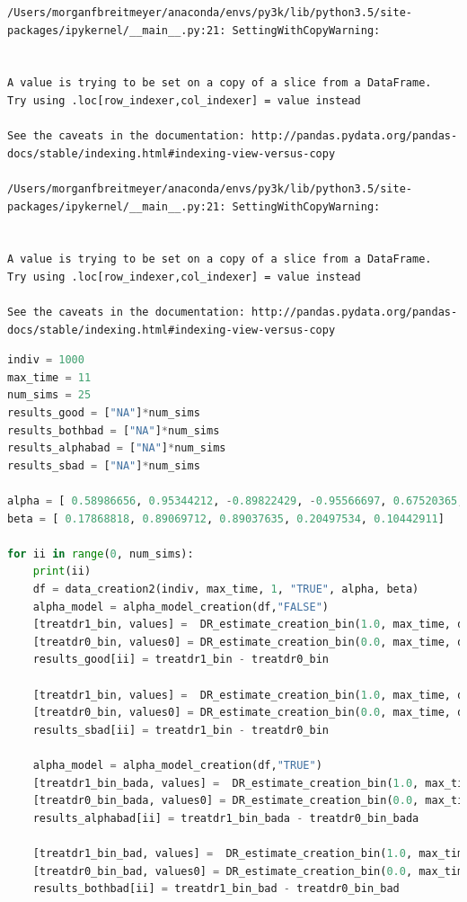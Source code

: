 \begin{lstlisting}
/Users/morganfbreitmeyer/anaconda/envs/py3k/lib/python3.5/site-packages/ipykernel/__main__.py:21: SettingWithCopyWarning:


A value is trying to be set on a copy of a slice from a DataFrame.
Try using .loc[row_indexer,col_indexer] = value instead

See the caveats in the documentation: http://pandas.pydata.org/pandas-docs/stable/indexing.html#indexing-view-versus-copy

/Users/morganfbreitmeyer/anaconda/envs/py3k/lib/python3.5/site-packages/ipykernel/__main__.py:21: SettingWithCopyWarning:


A value is trying to be set on a copy of a slice from a DataFrame.
Try using .loc[row_indexer,col_indexer] = value instead

See the caveats in the documentation: http://pandas.pydata.org/pandas-docs/stable/indexing.html#indexing-view-versus-copy
\end{lstlisting}

\begin{lstlisting}[language=Python]
indiv = 1000 
max_time = 11
num_sims = 25
results_good = ["NA"]*num_sims
results_bothbad = ["NA"]*num_sims
results_alphabad = ["NA"]*num_sims
results_sbad = ["NA"]*num_sims

alpha = [ 0.58986656, 0.95344212, -0.89822429, -0.95566697, 0.67520365, 2.46365403]
beta = [ 0.17868818, 0.89069712, 0.89037635, 0.20497534, 0.10442911]

for ii in range(0, num_sims): 
    print(ii) 
    df = data_creation2(indiv, max_time, 1, "TRUE", alpha, beta) 
    alpha_model = alpha_model_creation(df,"FALSE")
    [treatdr1_bin, values] =  DR_estimate_creation_bin(1.0, max_time, df, indiv, "FALSE", "FALSE", alpha_model)
    [treatdr0_bin, values0] = DR_estimate_creation_bin(0.0, max_time, df, indiv, "FALSE", "FALSE", alpha_model)
    results_good[ii] = treatdr1_bin - treatdr0_bin 
    
    [treatdr1_bin, values] =  DR_estimate_creation_bin(1.0, max_time, df, indiv, "FALSE", "TRUE", alpha_model)
    [treatdr0_bin, values0] = DR_estimate_creation_bin(0.0, max_time, df, indiv, "FALSE", "TRUE", alpha_model)
    results_sbad[ii] = treatdr1_bin - treatdr0_bin 
    
    alpha_model = alpha_model_creation(df,"TRUE")
    [treatdr1_bin_bada, values] =  DR_estimate_creation_bin(1.0, max_time, df, indiv, "TRUE", "FALSE", alpha_model)
    [treatdr0_bin_bada, values0] = DR_estimate_creation_bin(0.0, max_time, df, indiv, "TRUE", "FALSE", alpha_model)
    results_alphabad[ii] = treatdr1_bin_bada - treatdr0_bin_bada 

    [treatdr1_bin_bad, values] =  DR_estimate_creation_bin(1.0, max_time, df, indiv, "TRUE", "TRUE", alpha_model)
    [treatdr0_bin_bad, values0] = DR_estimate_creation_bin(0.0, max_time, df, indiv, "TRUE", "TRUE", alpha_model)
    results_bothbad[ii] = treatdr1_bin_bad - treatdr0_bin_bad 
\end{lstlisting}

